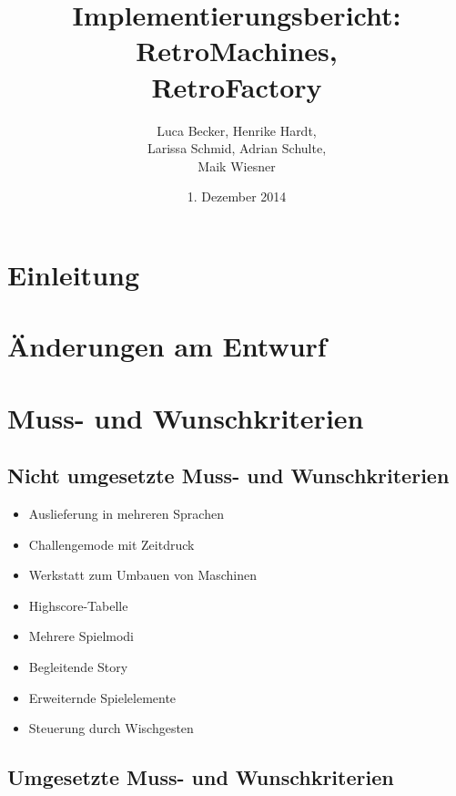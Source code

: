 \documentclass[parskip=full]{scrreprt}
\begin{document}
\title{Implementierungsbericht: RetroMachines, \\ RetroFactory}
\author{Luca Becker, Henrike Hardt,\\Larissa Schmid, Adrian Schulte,\\Maik Wiesner}
\date{1. Dezember 2014}
\maketitle
\thispagestyle{empty}

\clearpage

\thispagestyle{empty}
\tableofcontents
\thispagestyle{empty}

\clearpage
\setcounter{page}{1}

\chapter{Einleitung}

\chapter{Änderungen am Entwurf}

\chapter{Muss- und Wunschkriterien}

\section{Nicht umgesetzte Muss- und Wunschkriterien}

\begin{itemize}
	\item Auslieferung in mehreren Sprachen
	\item Challengemode mit Zeitdruck
	\item Werkstatt zum Umbauen von Maschinen
	\item Highscore-Tabelle
	\item Mehrere Spielmodi
	\item Begleitende Story
	\item Erweiternde Spielelemente
	\item Steuerung durch Wischgesten
\end{itemize}

\section{Umgesetzte Muss- und Wunschkriterien}
\end{document}
